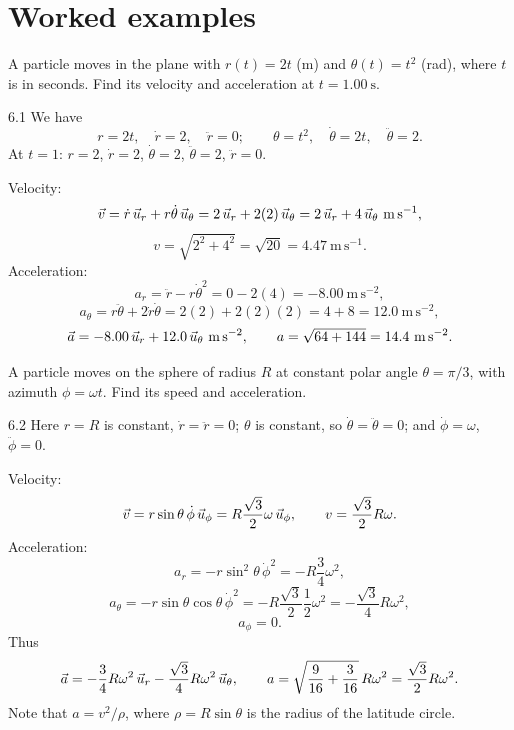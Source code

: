 \section{Worked examples}

\begin{worked}
A particle moves in the plane with $r(t)=2t$ (m) and $\theta(t)=t^2$ (rad),
where $t$ is in seconds. Find its velocity and acceleration at
$t=1.00\ \mathrm{s}$.
\end{worked}

\begin{solution}{6.1}
We have
\[
r=2t,\quad \dot r=2,\quad \ddot r=0;\qquad
\theta=t^2,\quad \dot\theta=2t,\quad \ddot\theta=2.
\]
At $t=1$: $r=2$, $\dot r=2$, $\dot\theta=2$, $\ddot\theta=2$, $\ddot r=0$.

Velocity:
\[
\vec v=\dot r\,\vec{u}_r+r\dot\theta\,\vec{u}_\theta
=2\,\vec{u}_r+2(2)\,\vec{u}_\theta=2\,\vec{u}_r+4\,\vec{u}_\theta\ \mathrm{m\,s^{-1}},
\]
\[
v=\sqrt{2^2+4^2}=\sqrt{20}=4.47\ \mathrm{m\,s^{-1}}.
\]
Acceleration:
\[
a_r=\ddot r-r\dot\theta^2=0-2(4)=-8.00\ \mathrm{m\,s^{-2}},
\]
\[
a_\theta=r\ddot\theta+2\dot r\dot\theta=2(2)+2(2)(2)=4+8=12.0\ \mathrm{m\,s^{-2}},
\]
\[
\vec a=-8.00\,\ur+12.0\,\ut\ \mathrm{m\,s^{-2}},\qquad
a=\sqrt{64+144}=14.4\ \mathrm{m\,s^{-2}}.
\]
\end{solution}

\begin{worked}
A particle moves on the sphere of radius $R$ at constant polar angle
$\theta=\pi/3$, with azimuth $\phi=\omega t$. Find its speed and acceleration.
\end{worked}

\begin{solution}{6.2}
Here $r=R$ is constant, $\dot r=\ddot r=0$; $\theta$ is constant, so
$\dot\theta=\ddot\theta=0$; and $\dot\phi=\omega$, $\ddot\phi=0$.

Velocity:
\[
\vec v=r\sin\theta\,\dot\phi\,\vec{u}_\phi
=R\frac{\sqrt3}{2}\omega\,\vec{u}_\phi,
\qquad
v=\frac{\sqrt3}{2}R\omega.
\]
Acceleration:
\[
a_r=-r\sin^2\theta\,\dot\phi^2
=-R\frac34\omega^2,
\]
\[
a_\theta=-r\sin\theta\cos\theta\,\dot\phi^2
=-R\frac{\sqrt3}{2}\frac12\omega^2
=-\frac{\sqrt3}{4}R\omega^2,
\]
\[
a_\phi=0.
\]
Thus
\[
\vec a=-\frac34R\omega^2\,\vec{u}_r-\frac{\sqrt3}{4}R\omega^2\,\vec{u}_\theta,
\qquad
a=\sqrt{\frac{9}{16}+\frac{3}{16}}\,R\omega^2
=\frac{\sqrt3}{2}R\omega^2.
\]
Note that $a=v^2/\rho$, where $\rho=R\sin\theta$ is the radius of the latitude
circle.
\end{solution}

